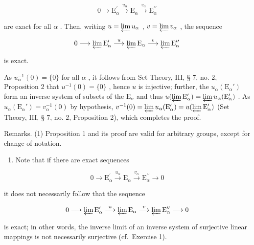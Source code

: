 \[
0 \longrightarrow \mathrm{E} _ {\alpha} ^ {\prime} \stackrel {u _ {\alpha}} {\longrightarrow} \mathrm{E} _ {\alpha} \stackrel {v _ {\alpha}} {\longrightarrow} \mathrm{E} _ {\alpha} ^ {\prime \prime}
\]

are exact for all \(\alpha\) . Then, writing \(u = \varprojlim u_{\alpha}\) , \(v = \varprojlim v_{\alpha}\) , the sequence

\[
0 \longrightarrow \varprojlim \mathrm{E} _ {\alpha} ^ {\prime} \stackrel {u} {\longrightarrow} \varprojlim \mathrm{E} _ {\alpha} \stackrel {v} {\longrightarrow} \varprojlim \mathrm{E} _ {\alpha} ^ {\prime \prime}
\]

is exact.

As \(u_{\alpha}^{-1}(0) = \{0\}\) for all \(\alpha\) , it follows from Set Theory, III, § 7, no. 2, Proposition 2 that \(u^{-1}(0) = \{0\}\) , hence \(u\) is injective; further, the \(u_{\alpha}(\mathrm{E}_{\alpha}')\) form an inverse system of subsets of the \(\mathrm{E}_{\alpha}\) and thus \(u(\varprojlim \mathrm{E}_{\alpha}') = \varprojlim u_{\alpha}(\mathrm{E}_{\alpha}')\) . As \(u_{\alpha}(\mathrm{E}_{\alpha}') = v_{\alpha}^{-1}(0)\) by hypothesis, \(v^{-1}(0) = \varprojlim u_{\alpha}(\mathrm{E}_{\alpha}') = u(\varprojlim \mathrm{E}_{\alpha}')\) (Set Theory, III, § 7, no. 2, Proposition 2), which completes the proof.

Remarks. (1) Proposition 1 and its proof are valid for arbitrary groups, except for change of notation.

\begin{enumerate}
\def\labelenumi{(\arabic{enumi})}
\setcounter{enumi}{1}
\tightlist
\item
  Note that if there are exact sequences
\end{enumerate}

\[
0 \longrightarrow \mathrm{E} _ {\alpha} ^ {\prime} \stackrel {u _ {\alpha}} {\longrightarrow} \mathrm{E} _ {\alpha} \stackrel {v _ {\alpha}} {\longrightarrow} \mathrm{E} _ {\alpha} ^ {\prime \prime} \longrightarrow 0
\]

it does not necessarily follow that the sequence

\[
0 \longrightarrow \varprojlim \mathrm{E} _ {\alpha} ^ {\prime} \stackrel {u} {\longrightarrow} \varprojlim \mathrm{E} _ {\alpha} \stackrel {v} {\longrightarrow} \varprojlim \mathrm{E} _ {\alpha} ^ {\prime \prime} \longrightarrow 0
\]

is exact; in other words, the inverse limit of an inverse system of surjective linear mappings is not necessarily surjective (cf.~Exercise 1).

